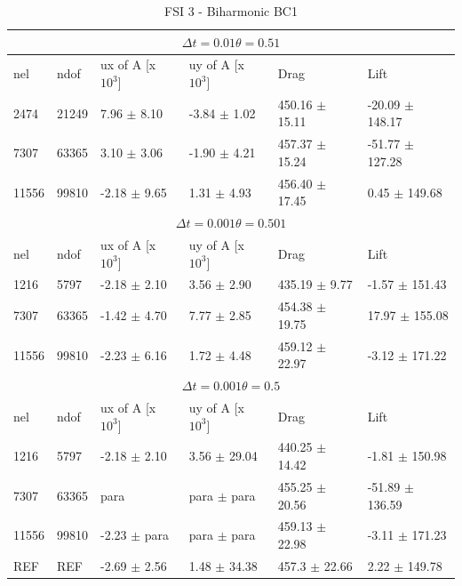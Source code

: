 \begin{table}[h!]
\centering
\caption{FSI 3 - Biharmonic BC1}
\label{my-label}
\begin{tabular}{ |p{0.9cm}||p{0.9cm}|p{2.49cm}|p{2.49cm}|p{2.6cm}|p{2.8cm}|}
 \hline
  \multicolumn{6}{|c|}{$\Delta t = 0.01 \theta = 0.51$} \\
   \hline
nel & ndof & ux of A [x $10^{3}$]  &uy of A [x $10^{3}$]& Drag  & Lift \\
 \hline
 2474     &21249  &7.96  $\pm$ 8.10  &  -3.84   $\pm$ 1.02 & 450.16  $\pm$ 15.11  & -20.09 $\pm$ 148.17 \\
 7307    & 63365  & 3.10  $\pm$ 3.06  & -1.90   $\pm$ 4.21 & 457.37  $\pm$ 15.24 & -51.77 $\pm$ 127.28 \\
 11556   & 99810  & -2.18  $\pm$ 9.65 & 1.31    $\pm$ 4.93  & 456.40 $\pm$ 17.45 &  0.45 $\pm$ 149.68  \\
 \hline
  \multicolumn{6}{|c|}{$\Delta t = 0.001 \theta = 0.501$} \\
   \hline
 nel & ndof & ux of A [x $10^{3}$]  &uy of A [x $10^{3}$]& Drag  & Lift \\
1216 &5797  & -2.18       $\pm$ 2.10 & 3.56   $\pm$ 2.90 & 435.19       $\pm$ 9.77  & -1.57       $\pm$ 151.43 \\
7307    & 63365  & -1.42  $\pm$ 4.70 & 7.77   $\pm$ 2.85 & 454.38       $\pm$ 19.75 & 17.97       $\pm$ 155.08 \\
11556   & 99810  & -2.23  $\pm$ 6.16 & 1.72   $\pm$ 4.48 & 459.12       $\pm$ 22.97 & -3.12       $\pm$ 171.22 \\
\hline
\multicolumn{6}{|c|}{$\Delta t = 0.001 \theta = 0.5$} \\
   \hline
 nel & ndof & ux of A [x $10^{3}$]  &uy of A [x $10^{3}$]& Drag  & Lift \\
\hline
1216 &  5797  & -2.18       $\pm$ 2.10 & 3.56  $\pm$ 29.04  & 440.25       $\pm$ 14.42 & -1.81       $\pm$ 150.98  \\
7307    & 63365  & para & para $\pm$ para & 455.25 $\pm$ 20.56 & -51.89  $\pm$ 136.59 \\
11556   & 99810  & -2.23  $\pm$ para & para $\pm$ para & 459.13 $\pm$ 22.98 & -3.11 $\pm$ 171.23  \\
\hline
\hline
 REF     & REF    & -2.69 $\pm$ 2.56    & 1.48 $\pm$ 34.38   & 457.3 $\pm$ 22.66  & 2.22 $\pm$ 149.78   \\
\hline
\end{tabular}
\end{table}

